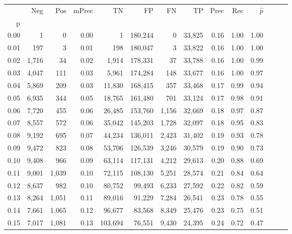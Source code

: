\begin{tabular}{rrrrrrrrrrrrrr}
\toprule
{} &    Neg &    Pos & mPrec &       TN &       FP &      FN &      TP &  Prec &   Rec & $\hat{p}$ \\
p    &        &        &       &          &          &         &         &       &       &           \\
\midrule
0.00 &      1 &      0 &  0.00 &        1 &  180,244 &       0 &  33,825 &  0.16 &  1.00 &      1.00 \\
0.01 &    197 &      3 &  0.01 &      198 &  180,047 &       3 &  33,822 &  0.16 &  1.00 &      1.00 \\
0.02 &  1,716 &     34 &  0.02 &    1,914 &  178,331 &      37 &  33,788 &  0.16 &  1.00 &      0.99 \\
0.03 &  4,047 &    111 &  0.03 &    5,961 &  174,284 &     148 &  33,677 &  0.16 &  1.00 &      0.97 \\
0.04 &  5,869 &    209 &  0.03 &   11,830 &  168,415 &     357 &  33,468 &  0.17 &  0.99 &      0.94 \\
0.05 &  6,935 &    344 &  0.05 &   18,765 &  161,480 &     701 &  33,124 &  0.17 &  0.98 &      0.91 \\
0.06 &  7,720 &    455 &  0.06 &   26,485 &  153,760 &   1,156 &  32,669 &  0.18 &  0.97 &      0.87 \\
0.07 &  8,557 &    572 &  0.06 &   35,042 &  145,203 &   1,728 &  32,097 &  0.18 &  0.95 &      0.83 \\
0.08 &  9,192 &    695 &  0.07 &   44,234 &  136,011 &   2,423 &  31,402 &  0.19 &  0.93 &      0.78 \\
0.09 &  9,472 &    823 &  0.08 &   53,706 &  126,539 &   3,246 &  30,579 &  0.19 &  0.90 &      0.73 \\
0.10 &  9,408 &    966 &  0.09 &   63,114 &  117,131 &   4,212 &  29,613 &  0.20 &  0.88 &      0.69 \\
0.11 &  9,001 &  1,039 &  0.10 &   72,115 &  108,130 &   5,251 &  28,574 &  0.21 &  0.84 &      0.64 \\
0.12 &  8,637 &    982 &  0.10 &   80,752 &   99,493 &   6,233 &  27,592 &  0.22 &  0.82 &      0.59 \\
0.13 &  8,264 &  1,051 &  0.11 &   89,016 &   91,229 &   7,284 &  26,541 &  0.23 &  0.78 &      0.55 \\
0.14 &  7,661 &  1,065 &  0.12 &   96,677 &   83,568 &   8,349 &  25,476 &  0.23 &  0.75 &      0.51 \\
0.15 &  7,017 &  1,081 &  0.13 &  103,694 &   76,551 &   9,430 &  24,395 &  0.24 &  0.72 &      0.47 \\

\end{tabular}
